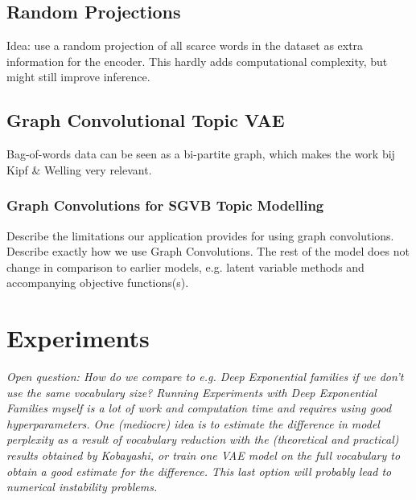 \documentclass{report}
\begin{document}
\section{Random Projections}
Idea: use a random projection of all scarce words in the dataset as extra information for the encoder. This hardly adds computational complexity, but might still improve inference.

\section{Graph Convolutional Topic VAE}
Bag-of-words data can be seen as a bi-partite graph, which makes the work bij Kipf \& Welling very relevant.
\subsection{Graph Convolutions for SGVB Topic Modelling}
Describe the limitations our application provides for using graph convolutions.\\
Describe exactly how we use Graph Convolutions. The rest of the model does not change in comparison to earlier models, e.g. latent variable methods and accompanying objective functions(s).


\chapter{Experiments}
	\textit{Open question: How do we compare to e.g. Deep Exponential families if we don't use the same vocabulary size? Running Experiments with Deep Exponential Families myself is a lot of work and computation time and requires using good hyperparameters. One (mediocre) idea is to estimate the difference in model perplexity as a result of vocabulary reduction with the (theoretical and practical) results obtained by Kobayashi, or train one VAE model on the full vocabulary to obtain a good estimate for the difference. This last option will probably lead to numerical instability problems.}
\end{document}
